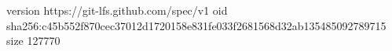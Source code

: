 version https://git-lfs.github.com/spec/v1
oid sha256:c45b552f870cec37012d1720158e831fe033f2681568d32ab135485092789715
size 127770
